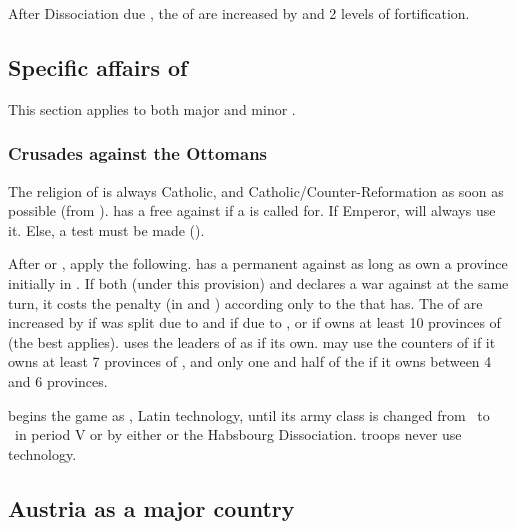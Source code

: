 \aparag After Dissociation due , the  of  are increased by \ARMY\faceplus and 2
levels of fortification.

\subsection{Specific affairs of \HAB}

This section applies to both major and minor \HAB.

\subsubsection{Crusades against the Ottomans}

The religion of  is always Catholic, and
Catholic/Counter-Reformation as soon as possible (from
).
\bparag \HAB has a free \CB against \TUR if a  is called
for. If Emperor,  will always use it. Else, a test must be made
().

After  or , apply the following.
\bparag \HAB has a permanent \CB against \TUR as long as \TUR own a
province initially in .
\bparag If both  (under this provision) and \SPA
declares a war against \TUR at the same turn, it costs the penalty (in
\STAB and \PV) according only to the \CB that \SPA has.
\bparag The  of \HAB are increased by
\ARMY\facemoins if  was split due to  and \ARMY\faceplus if due to ,
or \ARMY\faceplus if \HAB owns at least 10 provinces of 
(the best applies).
\bparag \HAB uses the leaders of  as if its own.  \HAB may
use the counters of  if it owns at least 7 provinces of
, and only one \ARMY and half of the \LD if it owns
between 4 and 6 provinces.

\aparag[Technology]
  begins the game as \CAIII, Latin technology,
until its army class is changed from \CAIII\ to \CAIV\ in period V or by either
 or the Habsbourg Dissociation.
\bparag {} troops never use \TTER technology.

\subsection{Austria as a major country}


